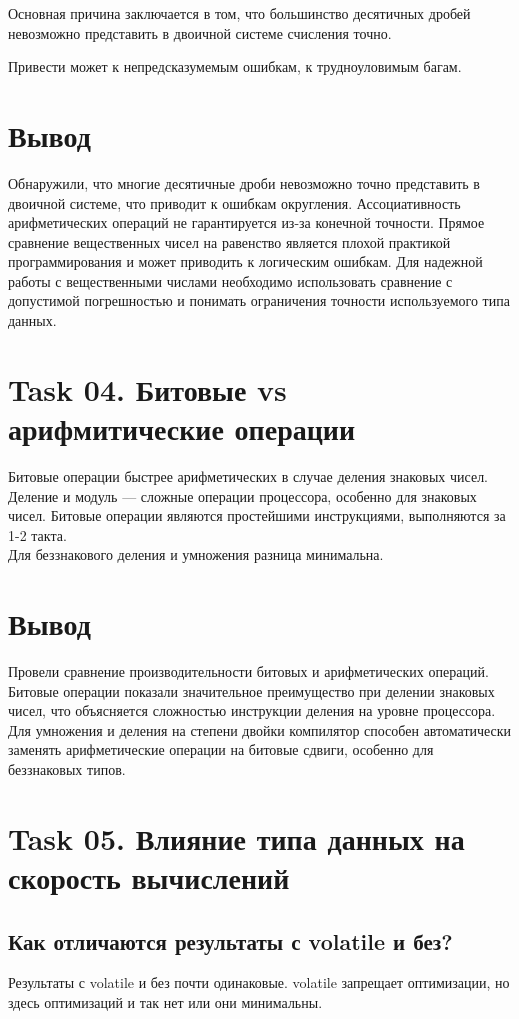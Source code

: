 \documentclass[12pt,a4paper]{article}
\begin{document}
    Основная причина заключается в том, что большинство десятичных дробей невозможно представить в двоичной системе счисления точно.

    Привести может к непредсказумемым ошибкам, к трудноуловимым багам.

    \section*{Вывод}
    Обнаружили, что многие десятичные дроби невозможно точно представить в двоичной системе, что приводит к ошибкам округления. Ассоциативность арифметических операций не гарантируется из-за конечной точности. Прямое сравнение вещественных чисел на равенство является плохой практикой программирования и может приводить к логическим ошибкам. Для надежной работы с вещественными числами необходимо использовать сравнение с допустимой погрешностью и понимать ограничения точности используемого типа данных.

    \section*{Task 04. Битовые vs арифмитические операции}

    Битовые операции быстрее арифметических в случае деления знаковых чисел.\\
    Деление и модуль — сложные операции процессора, особенно для знаковых чисел. Битовые операции являются простейшими инструкциями, выполняются за 1-2 такта.\\
    Для беззнакового деления и умножения разница минимальна.

    \section*{Вывод}
    Провели сравнение производительности битовых и арифметических операций. Битовые операции показали значительное преимущество при делении знаковых чисел, что объясняется сложностью инструкции деления на уровне процессора. Для умножения и деления на степени двойки компилятор способен автоматически заменять арифметические операции на битовые сдвиги, особенно для беззнаковых типов.

    \section*{Task 05. Влияние типа данных на скорость вычислений}

    \subsection*{Как отличаются результаты с volatile и без?}
    Результаты с volatile и без почти одинаковые. volatile запрещает оптимизации, но здесь оптимизаций и так нет или они минимальны.
\end{document}
